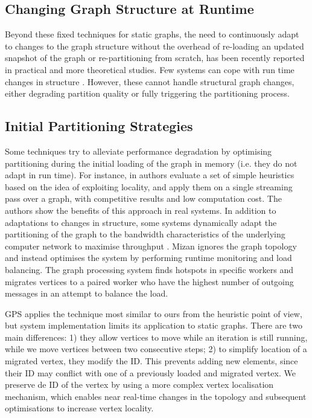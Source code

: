 \documentclass{sig-alternate-10pt}
\begin{document}
\subsection{Changing Graph Structure at Runtime}

Beyond these fixed techniques for static graphs, the need to continuously adapt to changes to the graph structure without the overhead of re-loading an updated snapshot of the graph or re-partitioning from scratch, has been recently reported in practical \cite{rostoker2007,Mucha2011,gaci2012} and more theoretical \cite{Nicosia2012} studies. Few systems can cope with run time changes in structure \cite{Najork2009,Sedge,Cheng2012}. However, these cannot handle structural graph changes, either degrading partition quality or fully triggering the partitioning process.  

\subsection{Initial Partitioning Strategies}

Some techniques try to alleviate performance degradation by optimising partitioning during the initial loading of the graph in memory (i.e. they do not adapt in run time). For instance, in \cite{Stanton2012} authors evaluate a set of simple heuristics based on the idea of exploiting locality, and apply them on a single streaming pass over a graph, with competitive results and low computation cost. The authors show the benefits of this approach in real systems. In addition to adaptations to changes in structure, some systems dynamically adapt the partitioning of the graph to the bandwidth characteristics of the underlying computer network to maximise throughput \cite{Chen2012}. Mizan \cite{Mizan} ignores the graph topology and instead optimises the system by performing runtime monitoring and load balancing. The graph processing system finds hotspots in specific workers and migrates vertices  to a paired worker who have the highest number of outgoing messages in an attempt to balance the load. 

GPS \cite{Salihoglu2012} applies the technique most similar to ours from the heuristic point of view, but system implementation limits its application to static graphs. There are two main differences: 1) they allow vertices to move while an iteration is still running, while we move vertices between two consecutive steps; 2) to simplify location of a migrated vertex, they modify the ID. This prevents adding new elements, since their ID may conflict with one of a previously loaded and migrated vertex. We preserve de ID of the vertex by using a more complex vertex localisation mechanism, which enables near real-time changes in the topology and subsequent optimisations to increase vertex locality.
\end{document}
